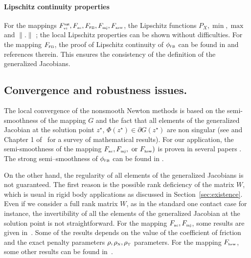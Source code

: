 



\paragraph{Lipschitz continuity properties} For the mappings $F^{\hbox{\sf \tiny{nat}}}_{\hbox{\tiny{vi}}}, F_{\hbox{\tiny{ac}}}, F_{{\hbox{\tiny{\textsf FB}}}}, F_{{\hbox{\tiny{mj}}}}, F_{{\hbox{\tiny{xsw}}}}$, 
the Lipschitz functions $P_X,\min,\max$ and $\|.\|$ ; the local Lipschitz properties can be shown without difficulties. For the mapping  $F_{{\hbox{\tiny{\textsf FB}}}}$, the proof of Lipschitz continuity of $\phi_{\hbox{\tiny{\textsf FB}}}$ can be found in \citep{Sun.Sun_MP2005} and references therein. This ensures the consistency of the definition of the generalized Jacobians.


\subsection{Convergence and robustness issues.}


The local convergence of the nonsmooth Newton methods is based on the semi-smoothness of the mapping $G$ and the fact that all elements of the generalized Jacobian at the solution point $z^\star$,  $\Phi(z^\star) \in \partial G(z^\star)$ are non singular (see \cite{Qi.Sun1993} and Chapter 1 of~\cite{Qi.ea_Book2018} for a survey of mathematical results). For our application, the semi-smoothness of the mapping $F_{\hbox{\tiny{ac}}},  F_{{\hbox{\tiny{mj}}}},  \text{ or } F_{\hbox{\tiny{hsw}}}) $ is proven in several papers \cite{Christensen.Pang1998,Hueber.ea_SJSC2008}. The strong semi--smoothness of $\phi_{\hbox{\tiny{\textsf FB}}}$ can be found in \citep{Sun.Sun_MP2005}.

On the other hand, the regularity of all elements of the generalized Jacobians is not guaranteed. The first reason is the possible rank deficiency of the matrix $W$, which is usual in rigid body applications as discussed in Section~\ref{sec:existence}. Even if we consider a full rank matrix $W$, as in the standard one contact case for instance, the invertibility of all the elements of the generalized Jacobian at the solution point is not straightforward. For the mapping $F_{\hbox{\tiny{ac}}},  F_{{\hbox{\tiny{mj}}}}$, some results are given in~\cite{Alart1993,Alart95,Jourdan.Alart.ea98}. Some of the results depends on the value of the coefficient of friction and the exact penalty parameters  $\rho, \rho_{\hbox{\tiny{N}}}, \rho_{\hbox{\tiny{T}}}$ parameters. For the mapping $F_{\hbox{\tiny{hsw}}}$, some other results can be found in~\cite{Hueber.ea_SJSC2008}.

